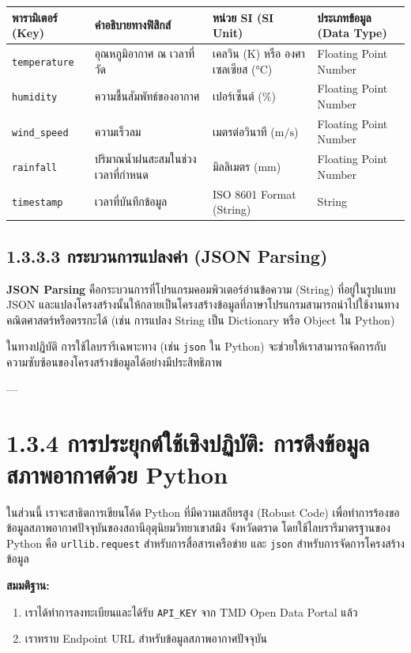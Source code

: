 \documentclass[11pt,a4paper,openany]{report}
\begin{document}
\begin{table}[htbp]
\centering
\begin{tabularx}{\textwidth}{L L L L}
\toprule
พารามิเตอร์ (Key) & คำอธิบายทางฟิสิกส์ & หน่วย SI (SI Unit) & ประเภทข้อมูล (Data Type) \\
\midrule
\texttt{temperature} & อุณหภูมิอากาศ ณ เวลาที่วัด & เคลวิน (K) หรือ องศาเซลเซียส ($\text{°C}$) & Floating Point Number \\
\texttt{humidity} & ความชื้นสัมพัทธ์ของอากาศ & เปอร์เซ็นต์ (\%) & Floating Point Number \\
\texttt{wind\_speed} & ความเร็วลม & เมตรต่อวินาที ($\text{m/s}$) & Floating Point Number \\
\texttt{rainfall} & ปริมาณน้ำฝนสะสมในช่วงเวลาที่กำหนด & มิลลิเมตร ($\text{mm}$) & Floating Point Number \\
\texttt{timestamp} & เวลาที่บันทึกข้อมูล & ISO 8601 Format (String) & String \\
\bottomrule
\end{tabularx}
\end{table}


\subsection{1.3.3.3 กระบวนการแปลงค่า (JSON Parsing)}


\textbf{JSON Parsing} คือกระบวนการที่โปรแกรมคอมพิวเตอร์อ่านข้อความ (String) ที่อยู่ในรูปแบบ JSON และแปลงโครงสร้างนั้นให้กลายเป็นโครงสร้างข้อมูลที่ภาษาโปรแกรมสามารถนำไปใช้งานทางคณิตศาสตร์หรือตรรกะได้ (เช่น การแปลง String เป็น Dictionary หรือ Object ใน Python)

ในทางปฏิบัติ การใช้ไลบรารีเฉพาะทาง (เช่น \texttt{json} ใน Python) จะช่วยให้เราสามารถจัดการกับความซับซ้อนของโครงสร้างข้อมูลได้อย่างมีประสิทธิภาพ

---

\section{1.3.4 การประยุกต์ใช้เชิงปฏิบัติ: การดึงข้อมูลสภาพอากาศด้วย Python}


ในส่วนนี้ เราจะสาธิตการเขียนโค้ด Python ที่มีความเสถียรสูง (Robust Code) เพื่อทำการร้องขอข้อมูลสภาพอากาศปัจจุบันของสถานีอุตุนิยมวิทยาเขาสมิง จังหวัดตราด โดยใช้ไลบรารีมาตรฐานของ Python คือ \texttt{urllib.request} สำหรับการสื่อสารเครือข่าย และ \texttt{json} สำหรับการจัดการโครงสร้างข้อมูล

\textbf{สมมติฐาน:}
\begin{enumerate}
  \item เราได้ทำการลงทะเบียนและได้รับ \texttt{API\_KEY} จาก TMD Open Data Portal แล้ว
  \item เราทราบ Endpoint URL สำหรับข้อมูลสภาพอากาศปัจจุบัน
\end{enumerate}
\end{document}
